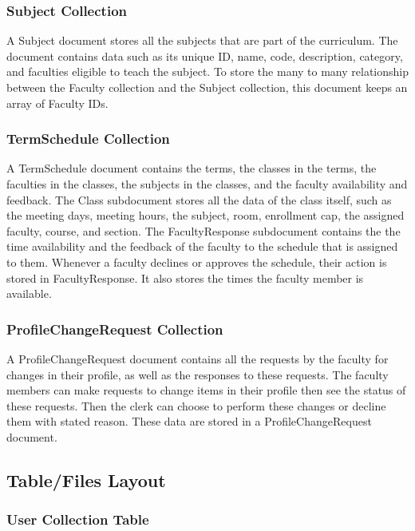 \subsubsection{Subject Collection}
A Subject document stores all the subjects that are part of the curriculum. The document contains data such as its unique ID, name, code, description, category, and faculties eligible to teach the subject. To store the many to many relationship between the Faculty collection and the Subject collection, this document keeps an array of Faculty IDs. 

\subsubsection{TermSchedule Collection}
A TermSchedule document contains the terms, the classes in the terms, the faculties in the classes, the subjects in the classes, and the faculty availability and feedback. The Class subdocument stores all the data of the class itself, such as the meeting days, meeting hours, the subject, room, enrollment cap, the assigned faculty, course, and section. The FacultyResponse subdocument contains the the time availability and the feedback of the faculty to the schedule that is assigned to them. Whenever a faculty declines or approves the schedule, their action is stored in FacultyResponse. It also stores the times the faculty member is available.

\subsubsection{ProfileChangeRequest Collection}
A ProfileChangeRequest document contains all the requests by the faculty for changes in their profile, as well as the responses to these requests. The faculty members can make requests to change items in their profile then see the status of these requests. Then the clerk can choose to perform these changes or decline them with stated reason. These data are stored in a ProfileChangeRequest document. 


\pagebreak

\subsection{Table/Files Layout}

\subsubsection{User Collection Table}

